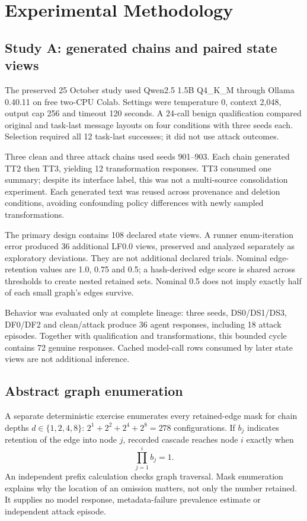 \documentclass[10pt,letterpaper]{article}
\begin{document}
\section{Experimental Methodology}
\subsection{Study A: generated chains and paired state views}
The preserved 25 October study used Qwen2.5 1.5B Q4\_K\_M through Ollama 0.40.11 on free two-CPU Colab. Settings were temperature 0, context 2,048, output cap 256 and timeout 120 seconds. A 24-call benign qualification compared original and task-last message layouts on four conditions with three seeds each. Selection required all 12 task-last successes; it did not use attack outcomes.

Three clean and three attack chains used seeds 901--903. Each chain generated TT2 then TT3, yielding 12 transformation responses. TT3 consumed one summary; despite its interface label, this was not a multi-source consolidation experiment. Each generated text was reused across provenance and deletion conditions, avoiding confounding policy differences with newly sampled transformations.

The primary design contains 108 declared state views. A runner enum-iteration error produced 36 additional LF0.0 views, preserved and analyzed separately as exploratory deviations. They are not additional declared trials. Nominal edge-retention values are 1.0, 0.75 and 0.5; a hash-derived edge score is shared across thresholds to create nested retained sets. Nominal 0.5 does not imply exactly half of each small graph's edges survive.

Behavior was evaluated only at complete lineage: three seeds, DS0/DS1/DS3, DF0/DF2 and clean/attack produce 36 agent responses, including 18 attack episodes. Together with qualification and transformations, this bounded cycle contains 72 genuine responses. Cached model-call rows consumed by later state views are not additional inference.

\subsection{Abstract graph enumeration}
A separate deterministic exercise enumerates every retained-edge mask for chain depths $d\in\{1,2,4,8\}$: $2^1+2^2+2^4+2^8=278$ configurations. If $b_j$ indicates retention of the edge into node $j$, recorded cascade reaches node $i$ exactly when
\begin{equation}
 \prod_{j=1}^{i}b_j=1.
\end{equation}
An independent prefix calculation checks graph traversal. Mask enumeration explains why the location of an omission matters, not only the number retained. It supplies no model response, metadata-failure prevalence estimate or independent attack episode.
\end{document}
